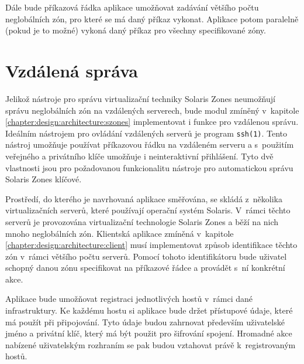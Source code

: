 Dále bude příkazová řádka aplikace umožňovat zadávání většího počtu neglobálních zón, pro které se má daný příkaz vykonat. Aplikace
potom paralelně (pokud je to možné) vykoná daný příkaz pro všechny specifikované zóny.
\section{Vzdálená správa}
\label{chapter:design:remote}
Jelikož nástroje pro správu virtualizační techniky Solaris Zones neumožňují správu neglobálních zón na vzdálených serverech,
bude modul zmíněný v~kapitole \ref{chapter:design:architecture:szones} implementovat i funkce pro vzdálenou správu. Ideálním
nástrojem pro ovládání vzdálených serverů je program \verb|ssh(1)|. Tento nástroj umožňuje používat příkazovou řádku na 
vzdáleném serveru a s~použitím veřejného a privátního klíče umožňuje i neinteraktivní přihlášení. Tyto dvě vlastnosti jsou
pro požadovanou funkcionalitu nástroje pro automatickou správu Solaris Zones klíčové.

Prostředí, do kterého je navrhovaná aplikace směřována, se skládá z~několika virtualizačních serverů, které používají operační
systém Solaris. V~rámci těchto serverů je provozována virtualizační technologie Solaris Zones a běží na nich mnoho neglobálních
zón. Klientská aplikace zmíněná v~kapitole \ref{chapter:design:architecture:client} musí implementovat způsob identifikace
těchto zón v~rámci většího počtu serverů. Pomocí tohoto identifikátoru bude uživatel schopný danou zónu specifikovat na příkazové
řádce a provádět s~ní konkrétní akce.

Aplikace bude umožňovat registraci jednotlivých hostů v~rámci dané infrastruktury. Ke každému hostu si aplikace
bude držet přístupové údaje, které má použít při připojování. Tyto údaje budou zahrnovat především uživatelské jméno a 
privátní klíč, který má být použit pro šifrování spojení. Hromadné akce nabízené uživatelským rozhraním se pak budou vztahovat
právě k~registrovaným hostů.
